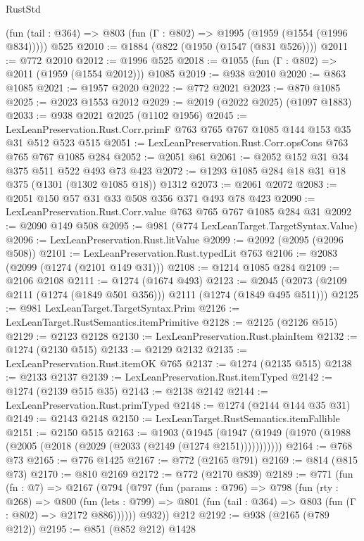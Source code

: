 \begin{lexlean}{RustStd}
\begin{coremodule}
    (fun (tail : @364) => @803 (fun (Γ : @802) => @1995 (@1959 (@1554 (@1996 @834)))))
    @525
@2010 := @1884 (@822 (@1950 (@1547 (@831 @526))))
@2011 := @772 @2010
@2012 := @1996 @525
@2018 := @1055 (fun (Γ : @802) => @2011 (@1959 (@1554 @2012))) @1085
@2019 := @938 @2010
@2020 := @863 @1085
@2021 := @1957 @2020
@2022 := @772 @2021
@2023 := @870 @1085
@2025 := @2023 @1553 @2012
@2029 := @2019 (@2022 @2025) (@1097 @1883)
@2033 := @938 @2021 @2025 (@1102 @1956)
@2045 := LexLeanPreservation.Rust.Corr.primF @763 @765 @767 @1085 @144 @153 @35 @31 @512 @523 @515
@2051 := LexLeanPreservation.Rust.Corr.opsCons @763 @765 @767 @1085 @284
@2052 := @2051 @61
@2061 := @2052 @152 @31 @34 @375 @511 @522 @493 @73 @423
@2072 := @1293 @1085 @284 @18 @31 @18 @375 (@1301 (@1302 @1085 @18)) @1312
@2073 := @2061 @2072
@2083 := @2051 @150 @57 @31 @33 @508 @356 @371 @493 @78 @423
@2090 := LexLeanPreservation.Rust.Corr.value @763 @765 @767 @1085 @284 @31
@2092 := @2090 @149 @508
@2095 := @981 (@774 LexLeanTarget.TargetSyntax.Value)
@2096 := LexLeanPreservation.Rust.litValue
@2099 := @2092 (@2095 (@2096 @508))
@2101 := LexLeanPreservation.Rust.typedLit @763
@2106 := @2083 (@2099 (@1274 (@2101 @149 @31)))
@2108 := @1214 @1085 @284
@2109 := @2106 @2108
@2111 := @1274 (@1674 @493)
@2123 := @2045 (@2073 (@2109 @2111 (@1274 (@1849 @501 @356))) @2111 (@1274 (@1849 @495 @511)))
@2125 := @981 LexLeanTarget.TargetSyntax.Prim
@2126 := LexLeanTarget.RustSemantics.itemPrimitive
@2128 := @2125 (@2126 @515)
@2129 := @2123 @2128
@2130 := LexLeanPreservation.Rust.plainItem
@2132 := @1274 (@2130 @515)
@2133 := @2129 @2132
@2135 := LexLeanPreservation.Rust.itemOK @765
@2137 := @1274 (@2135 @515)
@2138 := @2133 @2137
@2139 := LexLeanPreservation.Rust.itemTyped
@2142 := @1274 (@2139 @515 @35)
@2143 := @2138 @2142
@2144 := LexLeanPreservation.Rust.primTyped
@2148 := @1274 (@2144 @144 @35 @31)
@2149 := @2143 @2148
@2150 := LexLeanTarget.RustSemantics.itemFallible
@2151 := @2150 @515
@2163 := @1903
    (@1945 (@1947 (@1949 (@1970 (@1988 (@2005 (@2018 (@2029 (@2033 (@2149 (@1274 @2151)))))))))))
@2164 := @768 @73
@2165 := @776 @1425
@2167 := @772 (@2165 @791)
@2169 := @814 (@815 @73)
@2170 := @810 @2169
@2172 := @772 (@2170 @839)
@2189 := @771
    (fun (fn : @7) =>
    @2167
      (@794
        (@797
          (fun (params : @796) =>
          @798
            (fun (rty : @268) =>
            @800
              (fun (lets : @799) =>
              @801 (fun (tail : @364) => @803 (fun (Γ : @802) => @2172 @886))))))
        @932))
    @212
@2192 := @938 (@2165 (@789 @212))
@2195 := @851 (@852 @212) @1428

\end{coremodule}
\end{lexlean}
